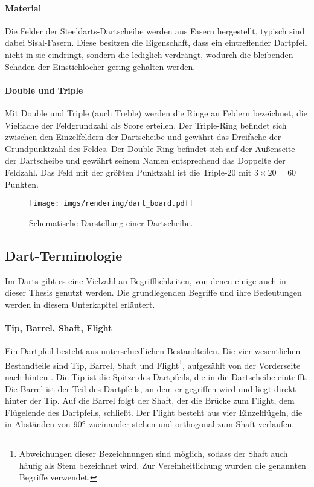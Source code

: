 \paragraph{Material}

Die Felder der Steeldarts-Dartscheibe werden aus Fasern hergestellt, typisch sind dabei Sisal-Fasern. Diese besitzen die Eigenschaft, dass ein eintreffender Dartpfeil nicht in sie eindringt, sondern die lediglich verdrängt, wodurch die bleibenden Schäden der Einstichlöcher gering gehalten werden.

\paragraph{Double und Triple}

Mit Double und Triple (auch Treble) werden die Ringe an Feldern bezeichnet, die Vielfache der Feldgrundzahl als Score erteilen. Der Triple-Ring befindet sich zwischen den Einzelfeldern der Dartscheibe und gewährt das Dreifache der Grundpunktzahl des Feldes. Der Double-Ring befindet sich auf der Außenseite der Dartscheibe und gewährt seinem Namen entsprechend das Doppelte der Feldzahl. Das Feld mit der größten Punktzahl ist die Triple-20 mit $3 \times 20 = 60$ Punkten.

\begin{figure}
    \centering
    \texttt{[image: imgs/rendering/dart\_board.pdf]}
    \caption{Schematische Darstellung einer Dartscheibe.}
    \label{img:dart_board}
\end{figure}



\subsection{Dart-Terminologie}
\label{sec:dart_terminologie}

Im Darts gibt es eine Vielzahl an Begrifflichkeiten, von denen einige auch in dieser Thesis genutzt werden. Die grundlegenden Begriffe und ihre Bedeutungen werden in diesem Unterkapitel erläutert.

\paragraph{Tip, Barrel, Shaft, Flight}

Ein Dartpfeil besteht aus unterschiedlichen Bestandteilen. Die vier wesentlichen Bestandteile sind Tip, Barrel, Shaft und Flight\footnote{Abweichungen dieser Bezeichnungen sind möglich, sodass der Shaft auch häufig als Stem bezeichnet wird. Zur Vereinheitlichung wurden die genannten Begriffe verwendet.}, aufgezählt von der Vorderseite nach hinten \cite{wdf-rules,pdc_rules}. Die Tip ist die Spitze des Dartpfeils, die in die Dartscheibe eintrifft. Die Barrel ist der Teil des Dartpfeils, an dem er gegriffen wird und liegt direkt hinter der Tip. Auf die Barrel folgt der Shaft, der die Brücke zum Flight, dem Flügelende des Dartpfeils, schließt. Der Flight besteht aus vier Einzelflügeln, die in Abständen von $90^{\circ}$ zueinander stehen und orthogonal zum Shaft verlaufen.

